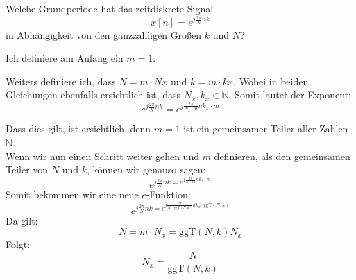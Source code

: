\begin{uebsp}
\begin{Exercise}
    Welche Grundperiode hat das zeitdiskrete Signal
    \[x[n]=e^{j\frac{2\pi}{N}nk}\]
    in Abhängigkeit von den ganzzahligen Größen $k$ und $N$?
\end{Exercise}
\begin{Answer}
Ich definiere am Anfang ein $m = 1$.

Weiters definiere ich, dass $N = m\cdot Nx$ und $k = m\cdot kx$. Wobei in beiden Gleichungen ebenfalls ersichtlich ist, dass $N_x, k_x \in \mathbb{N}$.
Somit lautet der Exponent:
\[e^{j\frac{2\pi}{N}nk}=e^{j\frac{2\pi}{N_x\cdot m}nk_x\cdot m}\]

Dass dies gilt, ist ersichtlich, denn $m=1$ ist ein gemeinsamer Teiler aller Zahlen $\mathbb N$.\\

Wenn wir nun einen Schritt weiter gehen und $m$ definieren, als den gemeinsamen Teiler von $N$ und $k$, können wir genauso sagen:
\[e^{j\frac{2\pi}{N}nk=e^{j\frac{2\pi}{N_x\cdot m}nk_x\cdot m}}\]
Somit bekommen wir eine neue $e$-Funktion:
\[e^{j\frac{2\pi}{N}nk=e^{j\frac{2\pi}{N_x\cdot \text{ggT}(N,k)}nk_x\cdot \text{ggT}(N,k)}}\]
Da gilt:
\[N=m\cdot N_x=\text{ggT}(N,k)N_x\]
Folgt:
\[N_x=\frac{N}{\text{ggT}(N,k)}\]
\end{Answer}
\end{uebsp}
